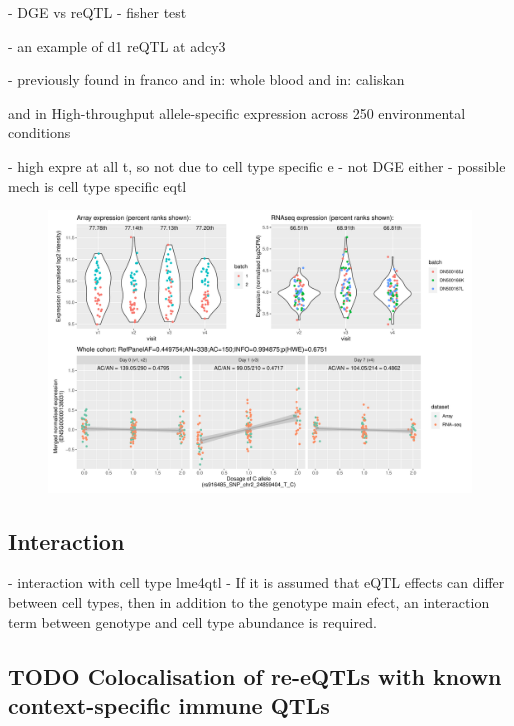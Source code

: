 - DGE vs reQTL
- fisher test

- an example of d1 reQTL at adcy3

- previously found in franco
and in:
whole blood
and in: 
caliskan

and in High-throughput allele-specific expression across 250 environmental conditions

- high expre at all t, so not due to cell type specific e
- not DGE either
- possible mech is cell type specific eqtl

\begin{figure}
    \centering
    \includegraphics[width=1.0\textwidth,page=1]{mainmatter/figures/chapter_03/plot_dge_eqtl_genotypes.ENSG00000138031,rs916485_SNP_chr2_24859404_T_C.pdf}
    \caption{}
    \label{fig:hird_eQTL_ADCY3}
\end{figure}

\subsection{Interaction}

- interaction with cell type lme4qtl
- If it is assumed that eQTL effects can differ between cell types, then in addition to the genotype main efect, an interaction term between genotype and cell type abundance is required.

\subsection{TODO Colocalisation of re-eQTLs with known context-specific immune QTLs}

